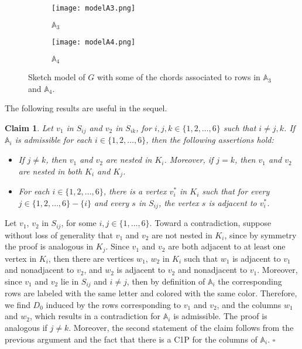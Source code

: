 \documentclass[12pt]{book}
\theoremstyle{plain}
\newtheorem{claim}[teo]{Claim}
\theoremstyle{remark}
\newcommand*{\QED}{\hfill\ensuremath{\square}}%
\begin{document}
\begin{figure}[h!]
  \begin{subfigure}[b]{0.5\textwidth}
    \texttt{[image: modelA3.png]}
    \caption{$\mathbb{A}_3$}
    \label{fig:modelA3}
  \end{subfigure}
  \hfill
  \begin{subfigure}[b]{0.48\textwidth}
    \texttt{[image: modelA4.png]}
    \caption{$\mathbb{A}_4$}    
    \label{fig:f2}
  \end{subfigure}
  \caption{Sketch model of $G$ with some of the chords associated to rows in $\mathbb{A}_3$ and $\mathbb{A}_4$.}
\end{figure}

The following results are useful in the sequel.

\begin{claim} \label{claim:tent_0}
Let $v_1$ in $S_{ij}$ and $v_2$ in $S_{ik}$, for $i,j,k \in \{1, 2, \ldots, 6 \}$ such that $i \neq j,k$. If $\mathbb A_i$ is admissible for each $i \in \{1, 2, \ldots, 6\}$, then the following assertions hold:
	\begin{itemize}
		\item If $j \neq k$, then $v_1$ and $v_2$ are nested in $K_i$. Moreover, if $j=k$, then $v_1$ and $v_2$ are nested in both $K_i$ and $K_j$.
		\item For each $i \in \{1, 2, \ldots, 6 \}$, there is a vertex $v^*_i$ in $K_i$ such that for every $j \in \{1, 2, \ldots, 6 \} - \{i\}$ and every $s$ in $S_{ij}$, the vertex $s$ is adjacent to $v^*_i$.
	\end{itemize}
\end{claim}

Let $v_1$, $v_2$ in $S_{ij}$, for some $i, j \in \{1, \ldots, 6\}$. Toward a contradiction, suppose without loss of generality that $v_1$ and $v_2$ are not nested in $K_i$, since by symmetry the proof is analogous in $K_j$. Since $v_1$ and $v_2$ are both adjacent to at least one vertex in $K_i$, then there are vertices $w_1$, $w_2$ in $K_i$ such that $w_1$ is adjacent to $v_1$ and nonadjacent to $v_2$, and $w_2$ is adjacent to $v_2$ and nonadjacent to $v_1$. 
Moreover, since $v_1$ and $v_2$ lie in $S_{ij}$ and $i \neq j$, then by definition of $\mathbb A_i$ the corresponding rows are labeled with the same letter and colored with the same color. 
Therefore, we find $D_0$ induced by the rows corresponding to $v_1$ and $v_2$, and the columns $w_1$ and $w_2$, which results in a contradiction for $\mathbb A_i$ is admissible. 
The proof is analogous if $j\neq k$. Moreover, the second statement of the claim follows from the previous argument and the fact that there is a C1P for the columns of $\mathbb A_i$. \QED
\end{document}
